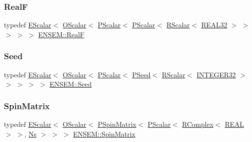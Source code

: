 \subsubsection{\texorpdfstring{RealF}{RealF}}
{\footnotesize\ttfamily typedef \mbox{\hyperlink{classENSEM_1_1EScalar}{E\+Scalar}}$<$ \mbox{\hyperlink{classENSEM_1_1OScalar}{O\+Scalar}}$<$ \mbox{\hyperlink{classENSEM_1_1PScalar}{P\+Scalar}}$<$ \mbox{\hyperlink{classENSEM_1_1PScalar}{P\+Scalar}}$<$ \mbox{\hyperlink{classENSEM_1_1RScalar}{R\+Scalar}}$<$ \mbox{\hyperlink{namespaceENSEM_a7540d01191172323e9073283d772576d}{R\+E\+A\+L32}} $>$ $>$ $>$ $>$ $>$ \mbox{\hyperlink{group__defs_gaaff7cc896fceee5b1ea6ba88497469ab}{E\+N\+S\+E\+M\+::\+RealF}}}

\mbox{\label{group__defs_ga8a5a983ab64ca8f6a5419885bacd4c40}} 
\subsubsection{\texorpdfstring{Seed}{Seed}}
{\footnotesize\ttfamily typedef \mbox{\hyperlink{classENSEM_1_1EScalar}{E\+Scalar}}$<$ \mbox{\hyperlink{classENSEM_1_1OScalar}{O\+Scalar}}$<$ \mbox{\hyperlink{classENSEM_1_1PScalar}{P\+Scalar}}$<$ \mbox{\hyperlink{classENSEM_1_1PSeed}{P\+Seed}}$<$ \mbox{\hyperlink{classENSEM_1_1RScalar}{R\+Scalar}}$<$ \mbox{\hyperlink{namespaceENSEM_a6a58e5c07422c48c5d547184b36719bf}{I\+N\+T\+E\+G\+E\+R32}} $>$ $>$ $>$ $>$ $>$ \mbox{\hyperlink{group__defs_ga8a5a983ab64ca8f6a5419885bacd4c40}{E\+N\+S\+E\+M\+::\+Seed}}}

\mbox{\label{group__defs_gad066768e154e358a7f3c0708c774be29}} 
\subsubsection{\texorpdfstring{SpinMatrix}{SpinMatrix}}
{\footnotesize\ttfamily typedef \mbox{\hyperlink{classENSEM_1_1EScalar}{E\+Scalar}}$<$ \mbox{\hyperlink{classENSEM_1_1OScalar}{O\+Scalar}}$<$ \mbox{\hyperlink{classENSEM_1_1PSpinMatrix}{P\+Spin\+Matrix}}$<$ \mbox{\hyperlink{classENSEM_1_1PScalar}{P\+Scalar}}$<$ \mbox{\hyperlink{classENSEM_1_1RComplex}{R\+Complex}}$<$ \mbox{\hyperlink{namespaceENSEM_a6dd9aa6508168f545c861787e63ddd1e}{R\+E\+AL}} $>$ $>$, \mbox{\hyperlink{namespaceENSEM_a6f05e048f9b2eb1a19131074f8abc25f}{Ns}} $>$ $>$ $>$ \mbox{\hyperlink{group__defs_gad066768e154e358a7f3c0708c774be29}{E\+N\+S\+E\+M\+::\+Spin\+Matrix}}}


